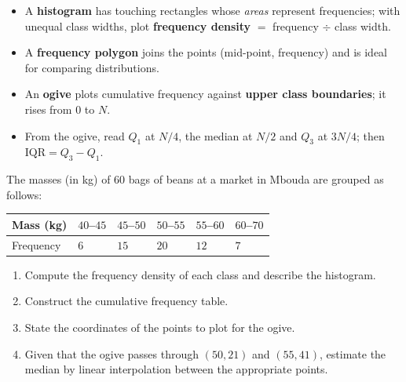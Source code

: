 \documentclass[11pt]{article}
\begin{document}
\begin{aretenir}
\begin{itemize}
\item A \textbf{histogram} has touching rectangles whose \emph{areas} represent frequencies; with unequal class widths, plot \textbf{frequency density} $=$ frequency $\div$ class width.
\item A \textbf{frequency polygon} joins the points (mid-point, frequency) and is ideal for comparing distributions.
\item An \textbf{ogive} plots cumulative frequency against \textbf{upper class boundaries}; it rises from $0$ to $N$.
\item From the ogive, read $Q_1$ at $N/4$, the median at $N/2$ and $Q_3$ at $3N/4$; then $\mathrm{IQR} = Q_3 - Q_1$.
\end{itemize}
\end{aretenir}

\begin{exercice}[Practice]
The masses (in kg) of 60 bags of beans at a market in Mbouda are grouped as follows:
\begin{center}
\begin{tabularx}{\linewidth}{|l|X|X|X|X|X|}
\hline
\rowcolor{popblueL} Mass (kg) & $40$--$45$ & $45$--$50$ & $50$--$55$ & $55$--$60$ & $60$--$70$ \\
\hline
Frequency & $6$ & $15$ & $20$ & $12$ & $7$ \\
\hline
\end{tabularx}
\end{center}
\begin{enumerate}
\item Compute the frequency density of each class and describe the histogram.
\item Construct the cumulative frequency table.
\item State the coordinates of the points to plot for the ogive.
\item Given that the ogive passes through $(50, 21)$ and $(55, 41)$, estimate the median by linear interpolation between the appropriate points.
\end{enumerate}
\end{exercice}
\end{document}
